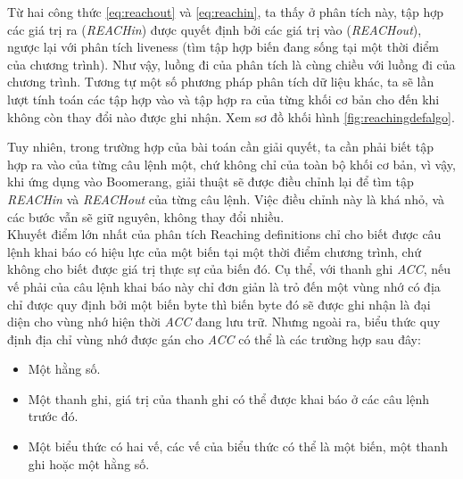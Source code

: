 Từ hai công thức \ref{eq:reachout} và \ref{eq:reachin}, ta thấy ở phân tích này, tập hợp các giá trị ra (\textit{REACHin}) được quyết định bởi các giá trị vào (\textit{REACHout}), ngược lại với phân tích liveness (tìm tập hợp biến đang sống tại một thời điểm của chương trình). Như vậy, luồng đi của phân tích là cùng chiều với luồng đi của chương trình. Tương tự một số phương pháp phân tích dữ liệu khác, ta sẽ lần lượt tính toán các tập hợp vào và tập hợp ra của từng khối cơ bản cho đến khi không còn thay đổi nào được ghi nhận. Xem sơ đồ khối hình \ref{fig:reachingdefalgo}.



Tuy nhiên, trong trường hợp của bài toán cần giải quyết, ta cần phải biết tập hợp ra vào của từng câu lệnh một, chứ không chỉ của toàn bộ khối cơ bản, vì vậy, khi ứng dụng vào Boomerang, giải thuật sẽ được điều chỉnh lại để tìm tập \textit{REACHin} và \textit{REACHout} của từng câu lệnh. Việc điều chỉnh này là khá nhỏ, và các bước vẫn sẽ giữ nguyên, không thay đổi nhiều.\\

Khuyết điểm lớn nhất của phân tích Reaching definitions chỉ cho biết được câu lệnh khai báo có hiệu lực của một biến tại một thời điểm chương trình, chứ không cho biết được giá trị thực sự của biến đó. Cụ thể, với thanh ghi \textit{ACC}, nếu vế phải của câu lệnh khai báo này chỉ đơn giản là trỏ đến một vùng nhớ có địa chỉ được quy định bởi một biến byte thì biến byte đó sẽ được ghi nhận là đại diện cho vùng nhớ hiện thời \textit{ACC} đang lưu trữ. Nhưng ngoài ra, biểu thức quy định địa chỉ vùng nhớ được gán cho \textit{ACC} có thể là các trường hợp sau đây:
\begin{itemize}
	\item Một hằng số.
		\item Một thanh ghi, giá trị của thanh ghi có thể được khai báo ở các câu lệnh trước đó.
	\item Một biểu thức có hai vế, các vế của biểu thức có thể là một biến, một thanh ghi hoặc một hằng số.

\end{itemize}


